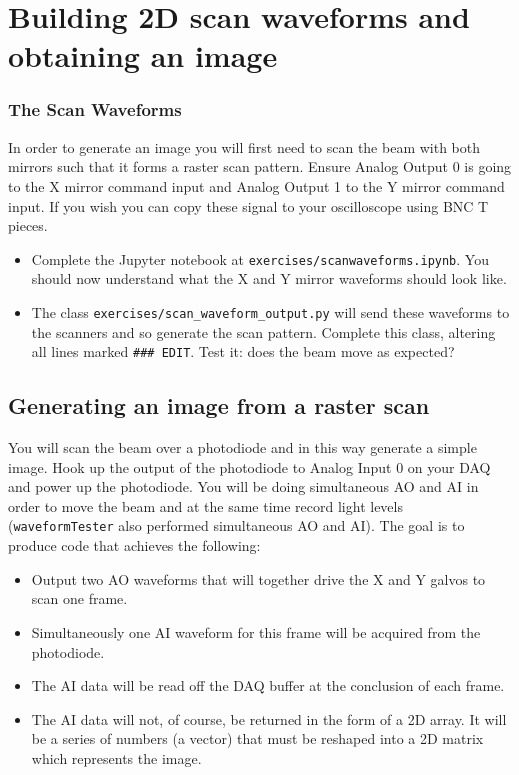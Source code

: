 \documentclass[a4paper]{report}
\begin{document}
\section{Building 2D scan waveforms and obtaining an image}

\subsubsection{The Scan Waveforms}
In order to generate an image you will first need to scan the beam with both mirrors such that it forms a raster scan pattern. 
Ensure Analog Output 0 is going to the X mirror command input and Analog Output 1 to the Y mirror command input.
If you wish you can copy these signal to your oscilloscope using BNC T pieces. 

\begin{itemize}
\item Complete the Jupyter notebook at \texttt{exercises/scanwaveforms.ipynb}. 
You should now understand what the X and Y mirror waveforms should look like. 
\item The class \texttt{exercises/scan\_waveform\_output.py} will send these waveforms to the scanners and so generate the scan pattern. 
Complete this class, altering all lines marked \texttt{### EDIT}.
Test it: does the beam move as expected?
\end{itemize}

\subsection{Generating an image from a raster scan}
You will scan the beam over a photodiode and in this way generate a simple image. 
Hook up the output of the photodiode to Analog Input 0 on your DAQ and power up the photodiode.
You will be doing simultaneous AO and AI in order to move the beam and at the same time record light levels (\texttt{waveformTester} also performed simultaneous AO and AI).
The goal is to produce code that achieves the following:

\begin{itemize}
    \item Output two AO waveforms that will together drive the X and Y galvos to scan one frame. 
    \item Simultaneously one AI waveform for this frame will be acquired from the photodiode. 
    \item The AI data will be read off the DAQ buffer at the conclusion of each frame.
    \item The AI data will not, of course, be returned in the form of a 2D array. It will be a series of numbers (a vector) that must be reshaped into a 2D matrix which represents the image.
\end{itemize}
\end{document}
